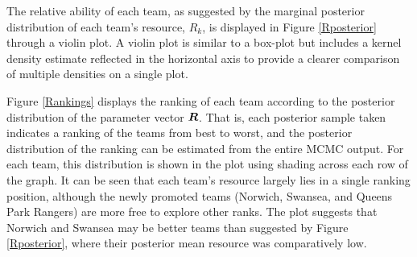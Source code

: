 %
\begin{table}
\centering
{}
\caption{\label{posteriorTable} A summary of posterior estimates for the 10 non-resource model parameters}
\end{table}

The relative ability of each team, as suggested by the marginal posterior distribution of each team's resource, \(R_k\),
is displayed in Figure \ref{Rposterior} through a violin plot. A violin plot is similar to a box-plot but includes a
kernel density estimate reflected in the horizontal axis to provide a clearer comparison of multiple densities on a
single plot.

Figure \ref{Rankings} displays the ranking of each team according to the posterior distribution of the parameter vector
\(\boldsymbol{R}\). That is, each posterior sample taken indicates a ranking of the teams from best to worst, and
the posterior distribution of the ranking can be estimated from the entire MCMC output. For each team, this distribution is
shown in the plot using shading across each row of the graph. It can be seen that each team's resource largely lies in a
single ranking position, although the newly promoted teams (Norwich, Swansea, and Queens Park Rangers) are more free to
explore other ranks. The plot suggests that Norwich and Swansea may be better teams than suggested by Figure
\ref{Rposterior}, where their posterior mean resource was comparatively low.

